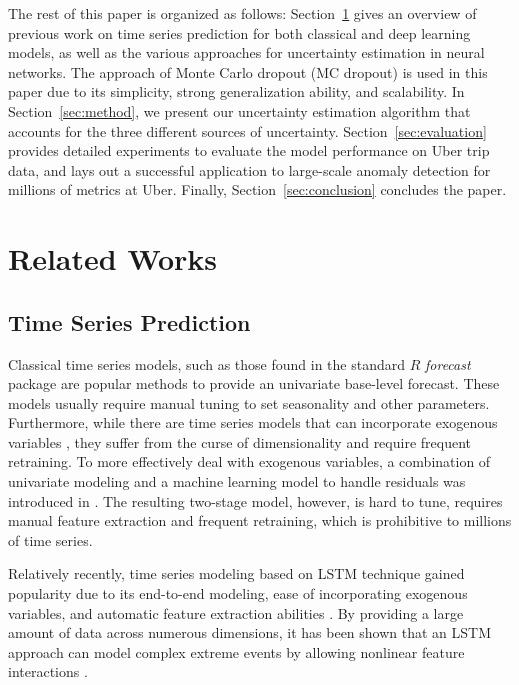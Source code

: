 \documentclass[conference,compsoc,final]{IEEEtran}
\begin{document}
The rest of this paper is organized as follows: Section~\ref{sec:related} gives an overview of previous work on time series prediction for both classical and deep learning models, as well as the various approaches for uncertainty estimation in neural networks. The approach of Monte Carlo dropout (MC dropout) is used in this paper due to its simplicity,  strong generalization ability, and scalability. In Section~\ref{sec:method}, we present our uncertainty estimation algorithm that accounts for the three different sources of uncertainty. Section~\ref{sec:evaluation} provides detailed experiments to evaluate the model performance on 
Uber trip data,
and lays out a successful application to large-scale anomaly detection for millions of metrics at Uber. 
Finally, Section~\ref{sec:conclusion} concludes the paper.




 

\section{Related Works}
\label{sec:related}

\subsection{Time Series Prediction}

Classical time series models, such as those found in the standard $R$ \textit{forecast}\cite{forecast} package are popular methods to provide an univariate base-level forecast. These models usually require manual tuning to set seasonality and other parameters. Furthermore, while there are time series models that can incorporate exogenous variables \cite{wei1994time}, they suffer from the curse of dimensionality and require frequent retraining. To more effectively deal with exogenous variables, a combination of univariate modeling and a machine learning model to handle residuals was introduced in \cite{2015arXiv150702537O}. The resulting two-stage model, however, is hard to tune, requires manual feature extraction and frequent retraining, which is prohibitive to millions of time series. 

Relatively recently, time series modeling based on LSTM \cite{Hochreiter:1997:LSM:1246443.1246450} technique gained popularity due to its end-to-end modeling, ease of incorporating exogenous variables, and automatic feature extraction abilities \cite{Assaad:2008:NBA:1297420.1297576}. By providing a large amount of data across numerous dimensions, it has been shown that an LSTM approach can model complex extreme events by allowing nonlinear feature interactions \cite{DBLP:journals/corr/OgunmoluGJG16, laptev:2017:1273496}.
\end{document}
